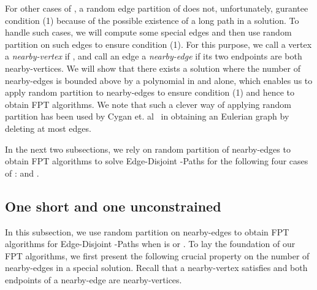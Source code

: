 \documentclass{llncs}
\begin{document}
For other cases of , a random edge partition of  does not,
unfortunately, gurantee condition (1) because of the possible existence
of a long path in a solution.
To handle such cases, we will compute some special edges and then use
random partition on such edges to ensure condition (1).
For this purpose, we call a vertex  a {\em nearby-vertex}
if , and call an edge a {\em nearby-edge}
if its two endpoints are both nearby-vertices.
We will show that there exists a solution where the number of nearby-edges
is bounded above by a polynomial in  and  alone, which enables us to
apply random partition to nearby-edges to ensure condition (1) and hence to
obtain FPT algorithms.
We note that such a clever way of applying random partition has been used by
Cygan et. al~\cite{cygan2014parameterized} in obtaining an Eulerian graph by deleting at most  edges.

In the next two subsections, we rely on random partition of nearby-edges
to obtain FPT algorithms to solve {\sc Edge-Disjoint -Paths}
for the following four cases of :
 and .

\subsection{One short and one unconstrained}

In this subsection, we use random partition on nearby-edges to obtain FPT algorithms
for {\sc Edge-Disjoint -Paths} when  is 
or .
To lay the foundation of our FPT algorithms, we first present the following
crucial property on the number of nearby-edges in a special solution.
Recall that a nearby-vertex  satisfies  and
both endpoints of a nearby-edge are nearby-vertices.
\end{document}
